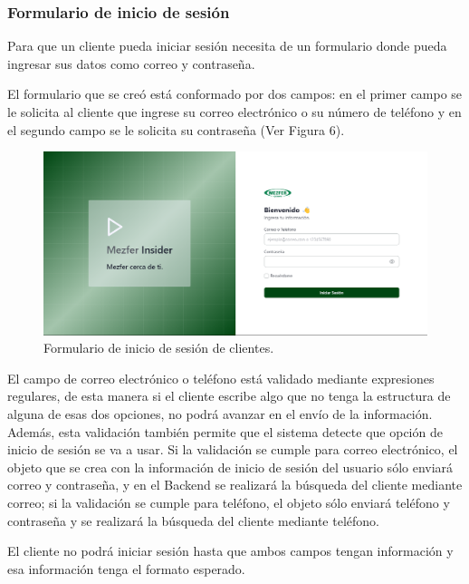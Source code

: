 \subsubsection{Formulario de inicio de sesión}
Para que un cliente pueda iniciar sesión necesita de un formulario donde pueda ingresar sus datos como correo y contraseña.

El formulario que se creó está conformado por dos campos: en el primer campo se le solicita al cliente que ingrese su correo electrónico o su número de teléfono y en el segundo campo se le solicita su contraseña (Ver Figura 6).

    \begin{figure}[H]
        \begin{center}
            \includegraphics[scale=0.35]{img/actividades/login/Formulario-login.png}
            \caption{Formulario de inicio de sesión de clientes.}
            \label{fig:formulario-login}
        \end{center}
    \end{figure}

El campo de correo electrónico o teléfono está validado mediante expresiones regulares, de esta manera si el cliente escribe algo que no tenga la estructura de alguna de esas dos opciones, no podrá avanzar en el envío de la información. Además, esta validación también permite que el sistema detecte que opción de inicio de sesión se va a usar. Si la validación se cumple para correo electrónico, el objeto que se crea con la información de inicio de sesión del usuario sólo enviará correo y contraseña, y en el Backend se realizará la búsqueda del cliente mediante correo; si la validación se cumple para teléfono, el objeto sólo enviará teléfono y contraseña y se realizará la búsqueda del cliente mediante teléfono.

El cliente no podrá iniciar sesión hasta que ambos campos tengan información y esa información tenga el formato esperado.